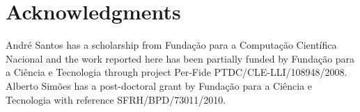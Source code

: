 \documentclass[a4paper,russian,UKenglish]{oasics}
\begin{document}
\section{Acknowledgments}

André Santos has a scholarship from Fundação para a Computação
Científica Nacional and the work reported here has been partially
funded by Fundação para a Ciência e Tecnologia through project
Per-Fide PTDC/CLE-LLI/108948/2008. Alberto Simões has a post-doctoral
grant by Fundação para a Ciência e Tecnologia with reference SFRH/BPD/73011/2010.







\end{document}
